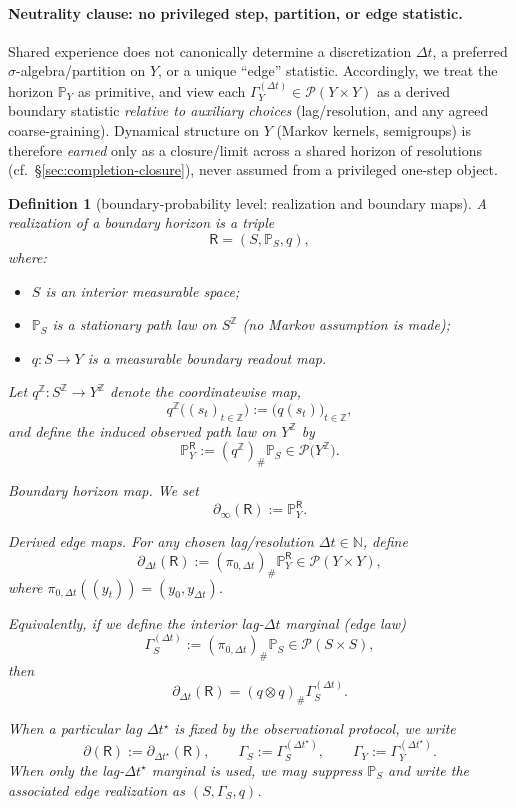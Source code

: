 \documentclass[11pt]{article}
\newtheorem{definition}{Definition}
\newcommand{\Pcal}{\mathcal{P}}
\begin{document}
\paragraph{Neutrality clause: no privileged step, partition, or edge statistic.}
Shared experience does not canonically determine a discretization $\Delta t$, a preferred $\sigma$-algebra/partition on $Y$, or a unique ``edge'' statistic.
Accordingly, we treat the horizon $\mathbb P_Y$ as primitive, and view each $\Gamma_Y^{(\Delta t)}\in\Pcal(Y\times Y)$ as a derived boundary statistic \emph{relative to auxiliary choices} (lag/resolution, and any agreed coarse-graining).
Dynamical structure on $Y$ (Markov kernels, semigroups) is therefore \emph{earned} only as a closure/limit across a shared horizon of resolutions (cf.\ \S\ref{sec:completion-closure}), never assumed from a privileged one-step object.


\begin{definition}[boundary-probability level: realization and boundary maps]
\label{def:realization-boundarymap}
A \emph{realization} of a boundary horizon is a triple
\[
\mathsf R=(S,\mathbb P_S,q),
\]
where:
\begin{itemize}[leftmargin=1.6em]
\item $S$ is an interior measurable space;
\item $\mathbb P_S$ is a \emph{stationary path law} on $S^{\mathbb Z}$ (no Markov assumption is made);
\item $q:S\to Y$ is a measurable \emph{boundary readout} map.
\end{itemize}
Let $q^{\mathbb Z}:S^{\mathbb Z}\to Y^{\mathbb Z}$ denote the coordinatewise map,
\[
q^{\mathbb Z}\bigl((s_t)_{t\in\mathbb Z}\bigr):=\bigl(q(s_t)\bigr)_{t\in\mathbb Z},
\]
and define the induced observed path law on $Y^{\mathbb Z}$ by
\[
\mathbb P_Y^{\mathsf R}:= (q^{\mathbb Z})_\#\mathbb P_S \in \Pcal\bigl(Y^{\mathbb Z}\bigr).
\]

\emph{Boundary horizon map.} We set
\[
\partial_\infty(\mathsf R) := \mathbb P_Y^{\mathsf R}.
\]

\emph{Derived edge maps.} For any chosen lag/resolution $\Delta t\in\mathbb N$, define
\[
\partial_{\Delta t}(\mathsf R)
:= (\pi_{0,\Delta t})_\#\mathbb P_Y^{\mathsf R}
\in \Pcal(Y\times Y),
\]
where $\pi_{0,\Delta t}((y_t))=(y_0,y_{\Delta t})$.

Equivalently, if we define the interior lag-$\Delta t$ marginal (edge law)
\[
\Gamma_S^{(\Delta t)} := (\pi_{0,\Delta t})_\#\mathbb P_S \in \Pcal(S\times S),
\]
then
\[
\partial_{\Delta t}(\mathsf R) = (q\otimes q)_\# \Gamma_S^{(\Delta t)}.
\]

When a particular lag $\Delta t^\star$ is fixed by the observational protocol, we write
\[
\partial(\mathsf R):=\partial_{\Delta t^\star}(\mathsf R),
\qquad
\Gamma_S:=\Gamma_S^{(\Delta t^\star)},
\qquad
\Gamma_Y := \Gamma_Y^{(\Delta t^\star)}.
\]
When only the lag-$\Delta t^\star$ marginal is used, we may suppress $\mathbb P_S$ and write the associated \emph{edge realization} as $(S,\Gamma_S,q)$.
\end{definition}
\end{document}

